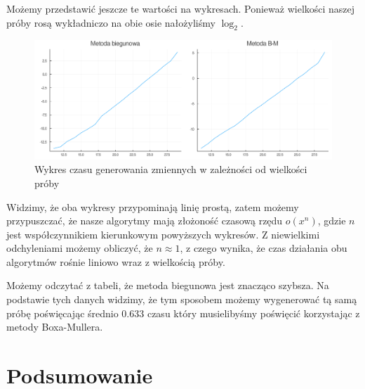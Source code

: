 \documentclass[12pt]{mwrep}
\begin{document}
	\noindent Możemy przedstawić jeszcze te wartości na wykresach. Ponieważ wielkości naszej próby rosą wykładniczo na obie osie nałożyliśmy $\log_2$. 
	\begin{figure}[H]\caption{Wykres czasu generowania zmiennych w zależności od wielkości próby}\label{fig:normal_time}
		\includegraphics[width=\columnwidth]{fig/fig_normal_time.png}
	\end{figure}
	\noindent Widzimy, że oba wykresy przypominają linię prostą, zatem możemy przypuszczać, że nasze algorytmy mają złożoność czasową rzędu $o(x^n)$, gdzie $n$ jest współczynnikiem kierunkowym powyższych wykresów. Z niewielkimi odchyleniami możemy obliczyć, że $n\approx 1$, z czego wynika, że czas działania obu algorytmów rośnie liniowo wraz z wielkością próby.
	
	\noindent Możemy odczytać z tabeli, że metoda biegunowa jest znacząco szybsza. Na podstawie tych danych widzimy, że tym sposobem możemy wygenerować tą samą próbę poświęcając średnio $0.633$ czasu który musielibyśmy poświęcić korzystając z metody Boxa-Mullera.
	
	\section{Podsumowanie}
\end{document}
